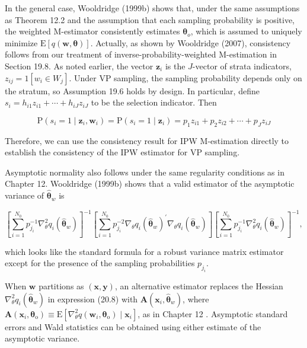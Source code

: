 \documentclass[10pt]{article}
\begin{document}
In the general case, Wooldridge (1999b) shows that, under the same assumptions as Theorem 12.2 and the assumption that each sampling probability is positive, the weighted M-estimator consistently estimates $\boldsymbol{\theta}_{o}$, which is assumed to uniquely\\
minimize $\mathrm{E}[q(\mathbf{w}, \boldsymbol{\theta})]$. Actually, as shown by Wooldridge (2007), consistency follows from our treatment of inverse-probability-weighted M-estimation in Section 19.8. As noted earlier, the vector $\mathbf{z}_{i}$ is the $J$-vector of strata indicators, $z_{i j}=1\left[w_{i} \in W_{j}\right]$. Under VP sampling, the sampling probability depends only on the stratum, so Assumption 19.6 holds by design. In particular, define $s_{i}=h_{i 1} z_{i 1}+\cdots+h_{i J} z_{i J}$ to be the selection indicator. Then


\begin{equation*}
\mathrm{P}\left(s_{i}=1 \mid \mathbf{z}_{i}, \mathbf{w}_{i}\right)=\mathrm{P}\left(s_{i}=1 \mid \mathbf{z}_{i}\right)=p_{1} z_{i 1}+p_{2} z_{i 2}+\cdots+p_{J} z_{i J} \tag{20.7}
\end{equation*}


Therefore, we can use the consistency result for IPW M-estimation directly to establish the consistency of the IPW estimator for VP sampling.

Asymptotic normality also follows under the same regularity conditions as in Chapter 12. Wooldridge (1999b) shows that a valid estimator of the asymptotic variance of $\hat{\boldsymbol{\theta}}_{w}$ is


\begin{equation*}
\left[\sum_{i=1}^{N_{0}} p_{j_{i}}^{-1} \nabla_{\theta}^{2} q_{i}\left(\hat{\boldsymbol{\theta}}_{w}\right)\right]^{-1}\left[\sum_{i=1}^{N_{0}} p_{j_{i}}^{-2} \nabla_{\theta} q_{i}\left(\hat{\boldsymbol{\theta}}_{w}\right)^{\prime} \nabla_{\theta} q_{i}\left(\hat{\boldsymbol{\theta}}_{w}\right)\right]\left[\sum_{i=1}^{N_{0}} p_{j_{i}}^{-1} \nabla_{\theta}^{2} q_{i}\left(\hat{\boldsymbol{\theta}}_{w}\right)\right]^{-1}, \tag{20.8}
\end{equation*}


which looks like the standard formula for a robust variance matrix estimator except for the presence of the sampling probabilities $p_{j_{i}}$.

When $\mathbf{w}$ partitions as $(\mathbf{x}, \mathbf{y})$, an alternative estimator replaces the Hessian $\nabla_{\theta}^{2} q_{i}\left(\hat{\boldsymbol{\theta}}_{w}\right)$ in expression (20.8) with $\mathbf{A}\left(\mathbf{x}_{i}, \hat{\boldsymbol{\theta}}_{w}\right)$, where $\mathbf{A}\left(\mathbf{x}_{i}, \boldsymbol{\theta}_{\mathrm{o}}\right) \equiv \mathrm{E}\left[\nabla_{\theta}^{2} q\left(\mathbf{w}_{i}, \boldsymbol{\theta}_{\mathrm{o}}\right) \mid \mathbf{x}_{i}\right]$, as in Chapter 12 . Asymptotic standard errors and Wald statistics can be obtained using either estimate of the asymptotic variance.
\end{document}
